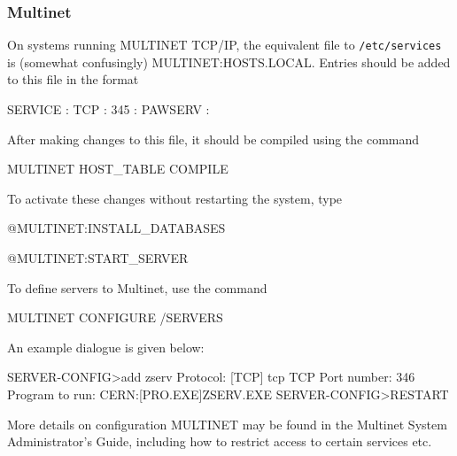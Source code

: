\subsubsection{Multinet}
\par
On systems running MULTINET TCP/IP, the equivalent file to
{\tt /etc/services} is (somewhat confusingly)
MULTINET:HOSTS.LOCAL. Entries should be added to this file in
the format
\begin{XMP}
SERVICE : TCP : 345 : PAWSERV :
\end{XMP}
After making changes to this file, it should be compiled using the
command
\begin{XMP}
MULTINET HOST_TABLE COMPILE
\end{XMP}
To activate these changes without restarting the system, type
\begin{XMP}
@MULTINET:INSTALL_DATABASES
\end{XMP}
\begin{XMP}
@MULTINET:START_SERVER
\end{XMP}
\par
To define servers to Multinet, use the command
\begin{XMP}
MULTINET CONFIGURE /SERVERS
\end{XMP}
An example dialogue is given below:
\begin{XMP}
SERVER-CONFIG>add zserv
Protocol: [TCP] tcp
TCP Port number: 346
Program to run: CERN:[PRO.EXE]ZSERV.EXE
SERVER-CONFIG>RESTART
\end{XMP}
\par
More details on configuration MULTINET may be found in
the Multinet System Administrator's Guide, including how to
restrict access to certain services etc.
